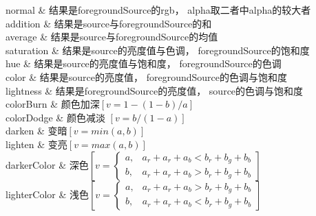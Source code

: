 ﻿




normal
    &
结果是foregroundSource的rgb，
alpha取二者中alpha的较大者
    \\

addition
    &
结果是source与foregroundSource的和
    \\

average
    &
结果是source与foregroundSource的均值
    \\

saturation
    &
结果是source的亮度值与色调，
foregroundSource的饱和度
    \\

hue
    &
结果是source的亮度值与饱和度，
foregroundSource的色调
    \\

color
    &
结果是source的亮度值，
foregroundSource的色调与饱和度
    \\

lightness
    &
结果是foregroundSource的亮度值，
source的色调与饱和度
    \\

colorBurn
    &
颜色加深$\left[v=1-(1-b)/a\right]$
    \\

colorDodge
    &
颜色减淡 $\left[v=b/(1-a)\right]$
    \\

darken
    &
变暗$\left[v=min(a,b)\right]$
    \\

lighten
    &
变亮$\left[v=max(a,b)\right]$
    \\

darkerColor
    &
深色$\left[v=\begin{cases}
a, & a_r+a_r+a_b<b_r+b_g+b_b \\
b, & a_r+a_r+a_b>b_r+b_g+b_b
\end{cases}\right]$
    \\

lighterColor
    &
浅色$\left[v=\begin{cases}
a, & a_r+a_r+a_b>b_r+b_g+b_b \\
b, & a_r+a_r+a_b<b_r+b_g+b_b
\end{cases}\right]$
    \\

